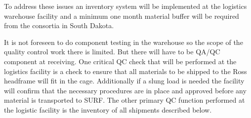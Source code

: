 To address these issues an inventory system will be implemented at the logistics warehouse facility and a minimum one month material buffer will be required from the consortia in South Dakota.

It is not foreseen to do component testing in the warehouse so the scope of the quality control work there is limited. But there will have to be QA/QC component at receiving. One critical QC check that will be performed at the logistics facility is a check to ensure that all materials to be shipped to the Ross headframe will fit in the cage. Additionally if a slung load is needed the facility will confirm that the necessary procedures are in place and approved before any material is transported to SURF. The other primary QC function performed at the logistic facility is the inventory of all shipments described below.

